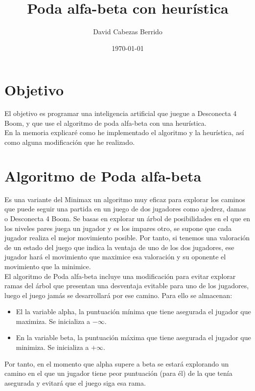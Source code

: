 \documentclass{article}
\begin{document}
\title{Poda alfa-beta con heurística}
\author{David Cabezas Berrido}
\date{\today}
\maketitle
\tableofcontents

\section{Objetivo}

El objetivo es programar una inteligencia artificial que juegue a Desconecta 4 Boom, y que use el algoritmo de poda alfa-beta con una heurística. \\

En la memoria explicaré como he implementado el algoritmo y la
heurística, así como alguna modificación que he realizado.


\section{Algoritmo de Poda alfa-beta}

Es una variante del Minimax un algoritmo muy eficaz para explorar los
caminos que puede seguir una partida en un juego de dos jugadores como
ajedrez, damas o Desconecta 4 Boom. Se basas en explorar un árbol de
posibilidades en el que en los niveles pares juega un jugador y es los
impares otro, se supone que cada jugador realiza el mejor movimiento
posible. Por tanto, si tenemos una valoración de un estado del juego
que indica la ventaja de uno de los dos jugadores, ese jugador hará el
movimiento que maximice esa valoración y su oponente el movimiento que
la minimice. \\

El algoritmo de Poda alfa-beta incluye una modificación para evitar
explorar ramas del árbol que presentan una desventaja evitable para
uno de los jugadores, luego el juego jamás se desarrollará por ese
camino. Para ello se almacenan:
\begin{itemize}
\item El la variable alpha, la puntuación mínima que tiene asegurada
  el jugador que maximiza. Se inicializa a $-\infty$.
\item En la variable beta, la puntuación máxima que tiene asegurada el
  jugador que minimiza. Se inicializa a $+\infty$.
\end{itemize}

Por tanto, en el momento que alpha supere a beta se estará explorando
un camino en el que un jugador tiene peor puntuación (para él) de la
que tenía asegurada y evitará que el juego siga esa rama. \\
\end{document}

